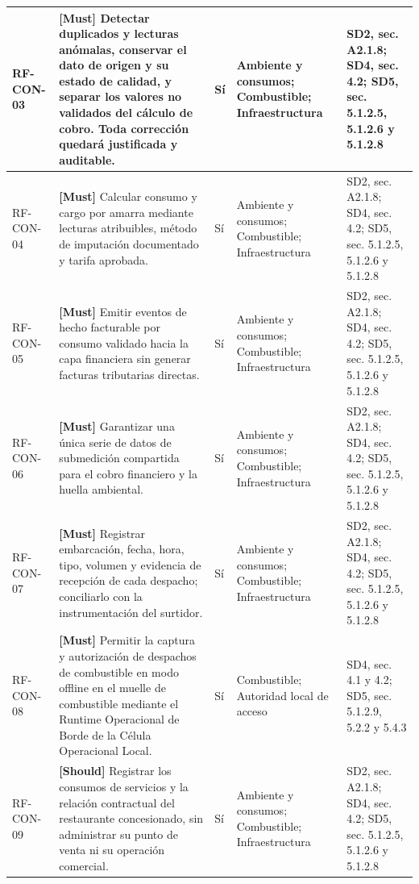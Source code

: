 \begin{paginaHorizontalSynaptix}
\begin{longtable}{|L{0.09\AnchoMatrizTDoce}|L{0.385\AnchoMatrizTDoce}|L{0.065\AnchoMatrizTDoce}|L{0.18\AnchoMatrizTDoce}|L{0.28\AnchoMatrizTDoce}|}
RF-\allowbreak{}CON-\allowbreak{}03 &
\textbf{[Must]} Detectar duplicados y lecturas anómalas, conservar el dato de origen y su estado de calidad, y separar los valores no validados del cálculo de cobro. Toda corrección quedará justificada y auditable. &
Sí &
Ambiente y consumos; Combustible; Infraestructura &
SD2, sec. A2.1.8; SD4, sec. 4.2; SD5, sec. 5.1.2.5, 5.1.2.6 y 5.1.2.8 \\ \hline

RF-\allowbreak{}CON-\allowbreak{}04 &
\textbf{[Must]} Calcular consumo y cargo por amarra mediante lecturas atribuibles, método de imputación documentado y tarifa aprobada. &
Sí &
Ambiente y consumos; Combustible; Infraestructura &
SD2, sec. A2.1.8; SD4, sec. 4.2; SD5, sec. 5.1.2.5, 5.1.2.6 y 5.1.2.8 \\ \hline

RF-\allowbreak{}CON-\allowbreak{}05 &
\textbf{[Must]} Emitir eventos de hecho facturable por consumo validado hacia la capa financiera sin generar facturas tributarias directas. &
Sí &
Ambiente y consumos; Combustible; Infraestructura &
SD2, sec. A2.1.8; SD4, sec. 4.2; SD5, sec. 5.1.2.5, 5.1.2.6 y 5.1.2.8 \\ \hline

RF-\allowbreak{}CON-\allowbreak{}06 &
\textbf{[Must]} Garantizar una única serie de datos de submedición compartida para el cobro financiero y la huella ambiental. &
Sí &
Ambiente y consumos; Combustible; Infraestructura &
SD2, sec. A2.1.8; SD4, sec. 4.2; SD5, sec. 5.1.2.5, 5.1.2.6 y 5.1.2.8 \\ \hline

RF-\allowbreak{}CON-\allowbreak{}07 &
\textbf{[Must]} Registrar embarcación, fecha, hora, tipo, volumen y evidencia de recepción de cada despacho; conciliarlo con la instrumentación del surtidor. &
Sí &
Ambiente y consumos; Combustible; Infraestructura &
SD2, sec. A2.1.8; SD4, sec. 4.2; SD5, sec. 5.1.2.5, 5.1.2.6 y 5.1.2.8 \\ \hline

RF-\allowbreak{}CON-\allowbreak{}08 &
\textbf{[Must]} Permitir la captura y autorización de despachos de combustible en modo offline en el muelle de combustible mediante el Runtime Operacional de Borde de la Célula Operacional Local. &
Sí &
Combustible; Autoridad local de acceso &
SD4, sec. 4.1 y 4.2; SD5, sec. 5.1.2.9, 5.2.2 y 5.4.3 \\ \hline

RF-\allowbreak{}CON-\allowbreak{}09 &
\textbf{[Should]} Registrar los consumos de servicios y la relación contractual del restaurante concesionado, sin administrar su punto de venta ni su operación comercial. &
Sí &
Ambiente y consumos; Combustible; Infraestructura &
SD2, sec. A2.1.8; SD4, sec. 4.2; SD5, sec. 5.1.2.5, 5.1.2.6 y 5.1.2.8 \\ \hline
\end{longtable}



\end{paginaHorizontalSynaptix}
